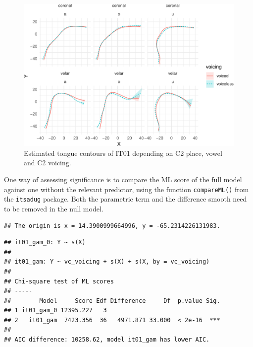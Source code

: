 \documentclass[12pt,]{article}
\begin{document}
\begin{figure}
\includegraphics[width=\linewidth]{2018-polar-gam_files/figure-latex/it01-gam-plot-1} \caption{Estimated tongue contours of IT01 depending on C2 place, vowel and C2 voicing.}\label{f:it01-gam-plot}
\end{figure}

One way of assessing significance is to compare the ML score of the full
model against one without the relevant predictor, using the function
\texttt{compareML()} from the \texttt{itsadug} package. Both the
parametric term and the difference smooth need to be removed in the null
model.

\begin{verbatim}
## The origin is x = 14.3900999664996, y = -65.2314226131983.
\end{verbatim}

\begin{verbatim}
## it01_gam_0: Y ~ s(X)
## 
## it01_gam: Y ~ vc_voicing + s(X) + s(X, by = vc_voicing)
## 
## Chi-square test of ML scores
## -----
##        Model     Score Edf Difference     Df  p.value Sig.
## 1 it01_gam_0 12395.227   3                                
## 2   it01_gam  7423.356  36   4971.871 33.000  < 2e-16  ***
## 
## AIC difference: 10258.62, model it01_gam has lower AIC.
\end{verbatim}


\end{document}
